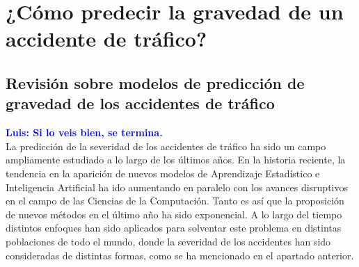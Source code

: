 \documentclass{uathesis-es}
\begin{document}


\chapter{¿Cómo predecir la gravedad de un accidente de tráfico?}



\section{Revisión sobre modelos de predicción de gravedad de los accidentes de tráfico}

\textcolor{blue}{\textbf{Luis: Si lo veis bien, se termina.}}\\

La predicción de la severidad de los accidentes de tráfico ha sido un campo ampliamente estudiado a lo largo de los últimos años. En la historia reciente, la tendencia en la aparición de nuevos modelos de Aprendizaje Estadístico e Inteligencia Artificial ha ido aumentando en paralelo con los avances disruptivos en el campo de las Ciencias de la Computación. Tanto es así que la proposición de nuevos métodos en el último año ha sido exponencial. A lo largo del tiempo distintos enfoques han sido aplicados para solventar este problema en distintas poblaciones de todo el mundo, donde la severidad de los accidentes han sido consideradas de distintas formas, como se ha mencionado en el apartado anterior.
\end{document}
